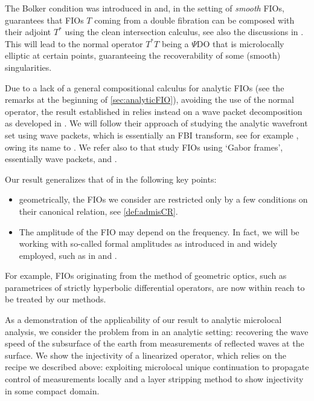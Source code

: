 \documentclass[
	fontsize=11pt, 
	twoside=false, 
	abstract=true, 
	a4paper,
]{scrartcl}
\begin{document}
The Bolker condition was introduced in \cite{MR812288} and, in the setting of \emph{smooth} FIOs, guarantees that FIOs $T$ coming from a double fibration can be composed with their adjoint $T^\ast$ using the clean intersection calculus, see also the discussions in \cite{MR0516965,zbMATH03698077}. %
This will lead to the normal operator $T^\ast T$ being a $\Psi$DO that is microlocally elliptic at certain points, guaranteeing the recoverability of some (smooth) singularities.

Due to a lack of a general compositional calculus for analytic FIOs (see the remarks at the beginning of \cref{sec:analyticFIO}), avoiding the use of the normal operator, the result established in \cite{2306.05906v1} relies instead on a wave packet decomposition as developed in \cite{zbMATH03605338}. We will follow their approach of studying the analytic wavefront set using wave packets, which is essentially an FBI transform, see for example \cite{MR1872698,zworski}, owing its name to \cite{SEDP_1974-1975____A17_0,bfb0062919}. We refer also to \cite{zbMATH06496469} that study FIOs using `Gabor frames', essentially wave packets, and \cite{zbMATH00042454}.

Our result generalizes that of \cite{2306.05906v1} in the following key points: 
\begin{itemize}
\item geometrically, the FIOs we consider are restricted only by a few conditions on their canonical relation, see \cref{def:admisCR}.
\item The amplitude of the FIO may depend on the frequency. In fact, we will be working with so-called formal amplitudes as introduced in \cite{zbMATH03310409} and widely employed, such as in \cite{AST_1982__95__R3_0} and \cite{MR4436039}.
\end{itemize}
For example, FIOs originating from the method of geometric optics, such as parametrices of strictly hyperbolic differential operators, are now within reach to be treated by our methods. %

As a demonstration of the applicability of our result to analytic microlocal analysis, we consider the problem from \cite{zbMATH04097945} in an analytic setting: recovering the wave speed of the subsurface of the earth from measurements of reflected waves at the surface. We show the injectivity of a linearized operator, which relies on the recipe we described above: exploiting microlocal unique continuation to propagate control of measurements locally and a layer stripping method to show injectivity in some compact domain. 
\end{document}
